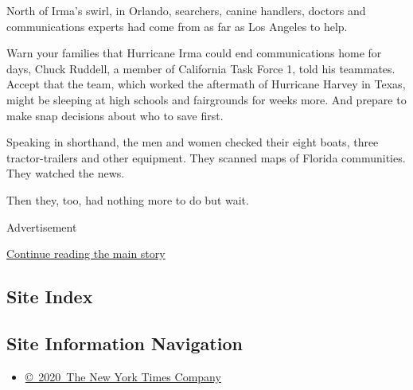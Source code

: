 North of Irma's swirl, in Orlando, searchers, canine handlers, doctors
and communications experts had come from as far as Los Angeles to help.

Warn your families that Hurricane Irma could end communications home for
days, Chuck Ruddell, a member of California Task Force 1, told his
teammates. Accept that the team, which worked the aftermath of Hurricane
Harvey in Texas, might be sleeping at high schools and fairgrounds for
weeks more. And prepare to make snap decisions about who to save first.

Speaking in shorthand, the men and women checked their eight boats,
three tractor-trailers and other equipment. They scanned maps of Florida
communities. They watched the news.

Then they, too, had nothing more to do but wait.

Advertisement

\protect\hyperlink{after-bottom}{Continue reading the main story}

\hypertarget{site-index}{%
\subsection{Site Index}\label{site-index}}

\hypertarget{site-information-navigation}{%
\subsection{Site Information
Navigation}\label{site-information-navigation}}

\begin{itemize}
\tightlist
\item
  \href{https://help.nytimes3xbfgragh.onion/hc/en-us/articles/115014792127-Copyright-notice}{©~2020~The
  New York Times Company}
\end{itemize}

